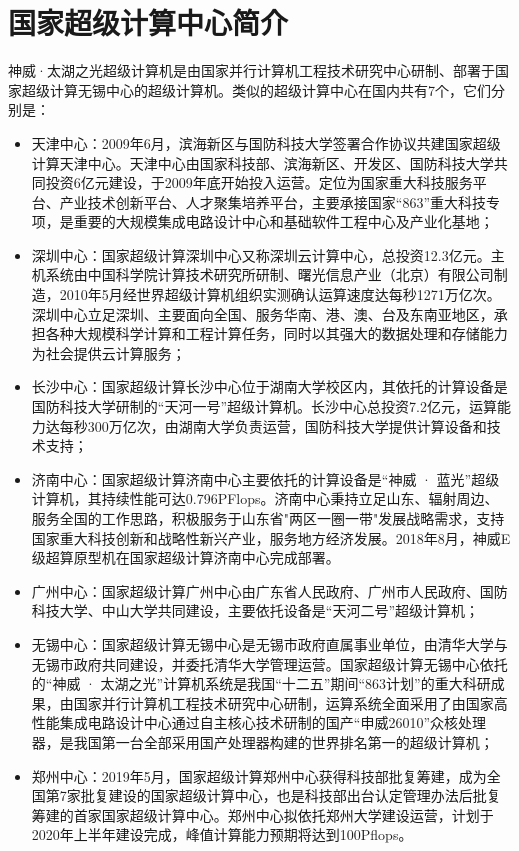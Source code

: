 \section*{国家超级计算中心简介}
神威·太湖之光超级计算机是由国家并行计算机工程技术研究中心研制、部署于国家超级计算无锡中心的超级计算机。类似的超级计算中心在国内共有7个，它们分别是：
\begin{itemize}
    \item 天津中心：2009年6月，滨海新区与国防科技大学签署合作协议共建国家超级计算天津中心。天津中心由国家科技部、滨海新区、开发区、国防科技大学共同投资6亿元建设，于2009年底开始投入运营。定位为国家重大科技服务平台、产业技术创新平台、人才聚集培养平台，主要承接国家“863”重大科技专项，是重要的大规模集成电路设计中心和基础软件工程中心及产业化基地；
    \item 深圳中心：国家超级计算深圳中心又称深圳云计算中心，总投资12.3亿元。主机系统由中国科学院计算技术研究所研制、曙光信息产业（北京）有限公司制造，2010年5月经世界超级计算机组织实测确认运算速度达每秒1271万亿次。深圳中心立足深圳、主要面向全国、服务华南、港、澳、台及东南亚地区，承担各种大规模科学计算和工程计算任务，同时以其强大的数据处理和存储能力为社会提供云计算服务；
    \item 长沙中心：国家超级计算长沙中心位于湖南大学校区内，其依托的计算设备是国防科技大学研制的“天河一号”超级计算机。长沙中心总投资7.2亿元，运算能力达每秒300万亿次，由湖南大学负责运营，国防科技大学提供计算设备和技术支持；
    \item 济南中心：国家超级计算济南中心主要依托的计算设备是“神威 · 蓝光”超级计算机，其持续性能可达0.796PFlops。济南中心秉持立足山东、辐射周边、服务全国的工作思路，积极服务于山东省"两区一圈一带"发展战略需求，支持国家重大科技创新和战略性新兴产业，服务地方经济发展。2018年8月，神威E级超算原型机在国家超级计算济南中心完成部署。
    \item 广州中心：国家超级计算广州中心由广东省人民政府、广州市人民政府、国防科技大学、中山大学共同建设，主要依托设备是“天河二号”超级计算机；
    \item 无锡中心：国家超级计算无锡中心是无锡市政府直属事业单位，由清华大学与无锡市政府共同建设，并委托清华大学管理运营。国家超级计算无锡中心依托的“神威 · 太湖之光”计算机系统是我国“十二五”期间“863计划”的重大科研成果，由国家并行计算机工程技术研究中心研制，运算系统全面采用了由国家高性能集成电路设计中心通过自主核心技术研制的国产“申威26010”众核处理器，是我国第一台全部采用国产处理器构建的世界排名第一的超级计算机；
    \item 郑州中心：2019年5月，国家超级计算郑州中心获得科技部批复筹建，成为全国第7家批复建设的国家超级计算中心，也是科技部出台认定管理办法后批复筹建的首家国家超级计算中心。郑州中心拟依托郑州大学建设运营，计划于2020年上半年建设完成，峰值计算能力预期将达到100Pflops。
\end{itemize}

